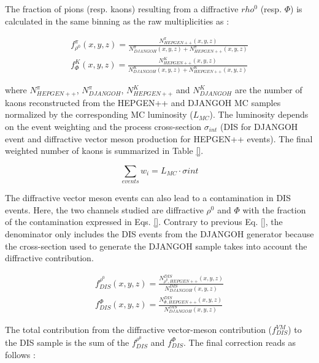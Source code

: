 The fraction of pions (resp. kaons) resulting from a diffractive $rho^0$ (resp. $\Phi$) is calculated in the same binning as the raw multiplicities as :

\begin{equation}
  \begin{split}
    f^{\pi}_{\rho^0}(x,y,z) = \frac{N^{\pi}_{HEPGEN++}(x,y,z)}{N^{\pi}_{DJANGOH}(x,y,z)+N^{\pi}_{HEPGEN++}(x,y,z)} \\
    f^K_{\Phi}(x,y,z) = \frac{N^K_{HEPGEN++}(x,y,z)}{N^K_{DJANGOH}(x,y,z)+N^K_{HEPGEN++}(x,y,z)}
  \end{split}
\end{equation}

where $N^{\pi}_{HEPGEN++}$, $N^{\pi}_{DJANGOH}$, $N^K_{HEPGEN++}$ and $N^K_{DJANGOH}$ are the number of kaons reconstructed from the HEPGEN++ and DJANGOH MC samples normalized by the corresponding
MC luminosity ($L_{MC}$). The luminosity depends on the event weighting and the process cross-section $\sigma_{int}$ (DIS for DJANGOH event and diffractive
vector meson production for HEPGEN++ events). The final weighted number of kaons is summarized in Table \ref{}.

\begin{equation}
  \sum_{events} w_i = L_{MC} \cdot \sigma{int}
\end{equation}

\begin{table}
  \caption{}
  \label{}

\end{table}

The diffractive vector meson events can also lead to a contamination in DIS events. Here, the two channels studied are diffractive $\rho^0$ and $\Phi$
with the fraction of the contamination expressed in Eqs. \ref{}. Contrary to previous Eq. \ref{}, the denominator only includes the DIS events from the
DJANGOH generator because the cross-section used to generate the DJANGOH sample takes into account the diffractive contribution.

\begin{equation}
  \begin{split}
    f^{\rho^0}_{DIS}(x,y,z) = \frac{N^{DIS}_{\rho^0,HEPGEN++}(x,y,z)}{N^{DIS}_{DJANGOH}(x,y,z)} \\
    f^{\Phi}_{DIS}(x,y,z) = \frac{N^{DIS}_{\Phi,HEPGEN++}(x,y,z)}{N^{DIS}_{DJANGOH}(x,y,z)}
  \end{split}
\end{equation}

The total contribution from the diffractive vector-meson contribution ($f^{VM}_{DIS}$) to the DIS sample is the sum of the $f^{\rho^0}_{DIS}$ and $f^{\Phi}_{DIS}$.
The final correction reads as follows :

